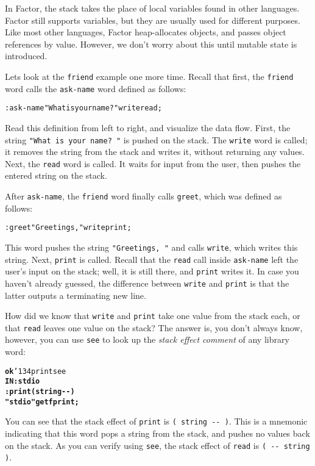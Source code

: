 \documentclass[english]{book}
\newcommand{\ttbackslash}{\char'134}
\begin{document}
In Factor, the stack takes the place of local variables found in other languages. Factor still supports variables, but they are usually used for different purposes. Like most other languages, Factor heap-allocates objects, and passes object references by value. However, we don't worry about this until mutable state is introduced.

Lets look at the \texttt{friend} example one more time. Recall that first, the \texttt{friend} word calls the \texttt{ask-name} word defined as follows:

\begin{alltt}
: ask-name "What is your name? " write read ;
\end{alltt}

Read this definition from left to right, and visualize the data flow. First, the string \texttt{"What is your name? "} is pushed on the stack. The \texttt{write} word is called; it removes the string from the stack and writes it, without returning any values. Next, the \texttt{read} word is called. It waits for input from the user, then pushes the entered string on the stack.

After \texttt{ask-name}, the \texttt{friend} word finally calls \texttt{greet}, which was defined as follows:

\begin{alltt}
: greet "Greetings, " write print ;
\end{alltt}

This word pushes the string  \texttt{"Greetings, "} and calls \texttt{write}, which writes this string. Next, \texttt{print} is called. Recall that the \texttt{read} call inside \texttt{ask-name} left the user's input on the stack; well, it is still there, and \texttt{print} writes it. In case you haven't already guessed, the difference between \texttt{write} and \texttt{print} is that the latter outputs a terminating new line.

How did we know that \texttt{write} and \texttt{print} take one value from the stack each, or that \texttt{read} leaves one value on the stack? The answer is, you don't always know, however, you can use \texttt{see} to look up the \emph{stack effect comment} of any library word:

\begin{alltt}
\textbf{ok} \ttbackslash print see
\textbf{IN: stdio
: print ( string -{}- )
    "stdio" get fprint ;}
\end{alltt}

You can see that the stack effect of \texttt{print} is \texttt{( string -{}- )}. This is a mnemonic indicating that this word pops a string from the stack, and pushes no values back on the stack. As you can verify using \texttt{see}, the stack effect of \texttt{read} is \texttt{( -{}- string )}.
\end{document}
